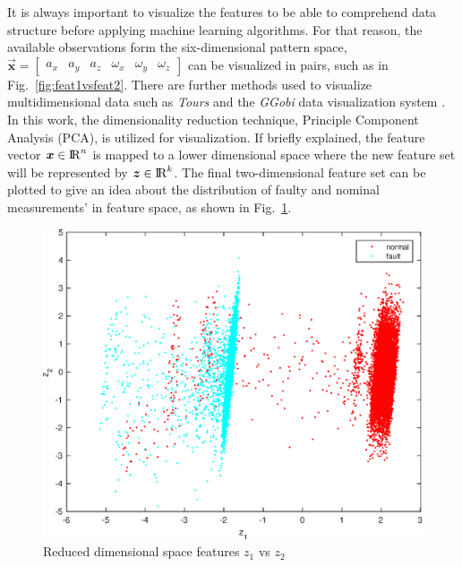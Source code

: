 It is always important to visualize the features to be able to comprehend data structure before applying machine learning algorithms. 
For that reason, the available observations form the six-dimensional pattern space,  $\vec{\bm{x}} = \begin{bmatrix} {a_x} & {a_y} & {a_z} & {\omega_x} & {\omega_y} & {\omega_z}  \end{bmatrix}$ can be visualized in pairs, such as in Fig.~\ref{fig:feat1vsfeat2}. 
There are further methods used to visualize multidimensional data such as \emph{Tours}\cite{asimov1985grand,cook1997manual,cook1995grand} and the \emph{GGobi} data visualization system \cite{cook2007interactive}. In this work, the dimensionality reduction technique, Principle Component Analysis (PCA), is utilized for visualization. If briefly explained, the feature vector $\bm{x}\in{\rm I\!R}^{n}$ is mapped to a lower dimensional space where the 
new feature set will be represented by $\bm{z}\in{\rm I\!R}^{k}$. The final two-dimensional feature set can be plotted to give an idea about the distribution of faulty and nominal measurements' in feature space, as shown in Fig.~\ref{fig:z1_vs_z2}.

\begin{figure}
\begin{center}
\includegraphics[width=12cm]{figures/reduceDimMeasurements}    %
\caption{Reduced dimensional space features $z_1$ vs $z_2$ } 
\label{fig:z1_vs_z2}
\end{center}
\end{figure}

